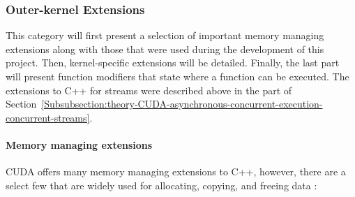 \subsubsection{Outer-kernel Extensions}\label{Subsubsection:theory-CUDA-C++-extensions-outer-kernel-extensions}
This category will first present a selection of important memory managing extensions along with those that were used during the development of this project. Then, kernel-specific extensions will be detailed. Finally, the last part will present function modifiers that state where a function can be executed. The extensions to C++ for streams were described above in the \textit{} part of Section~\ref{Subsubsection:theory-CUDA-asynchronous-concurrent-execution-concurrent-streams}.

\paragraph{Memory managing extensions}\label{Paragraph:theory-CUDA-C++-extensions-outer-kernel-extensions-memory-managing-extensions}
CUDA offers many memory managing extensions to C++, however, there are a select few that are widely used for allocating, copying, and freeing data \cite{NVIDIAMay2022, NvidiaJanuary2022, Cejka2020}:

